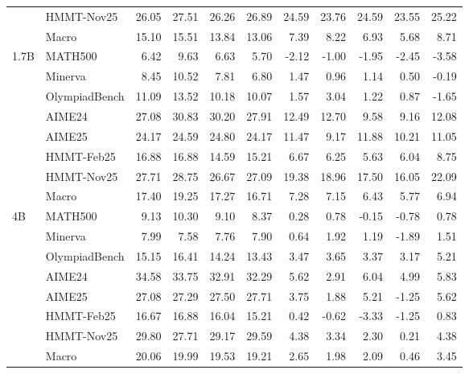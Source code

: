 \documentclass[10pt]{article}
\begin{document}
\begin{table}[h]
\begin{tabular}{llrrrrrrrr|r}
 & HMMT-Nov25 & 26.05 & 27.51 & 26.26 & 26.89 & 24.59 & 23.76 & 24.59 & 23.55 & 25.22 \\
\cmidrule(lr){2-11}
 & Macro & 15.10 & 15.51 & 13.84 & 13.06 & 7.39 & 8.22 & 6.93 & 5.68 & 8.71 \\
\midrule
1.7B & MATH500 & 6.42 & 9.63 & 6.63 & 5.70 & -2.12 & -1.00 & -1.95 & -2.45 & -3.58 \\
 & Minerva & 8.45 & 10.52 & 7.81 & 6.80 & 1.47 & 0.96 & 1.14 & 0.50 & -0.19 \\
 & OlympiadBench & 11.09 & 13.52 & 10.18 & 10.07 & 1.57 & 3.04 & 1.22 & 0.87 & -1.65 \\
 & AIME24 & 27.08 & 30.83 & 30.20 & 27.91 & 12.49 & 12.70 & 9.58 & 9.16 & 12.08 \\
 & AIME25 & 24.17 & 24.59 & 24.80 & 24.17 & 11.47 & 9.17 & 11.88 & 10.21 & 11.05 \\
 & HMMT-Feb25 & 16.88 & 16.88 & 14.59 & 15.21 & 6.67 & 6.25 & 5.63 & 6.04 & 8.75 \\
 & HMMT-Nov25 & 27.71 & 28.75 & 26.67 & 27.09 & 19.38 & 18.96 & 17.50 & 16.05 & 22.09 \\
\cmidrule(lr){2-11}
 & Macro & 17.40 & 19.25 & 17.27 & 16.71 & 7.28 & 7.15 & 6.43 & 5.77 & 6.94 \\
\midrule
4B & MATH500 & 9.13 & 10.30 & 9.10 & 8.37 & 0.28 & 0.78 & -0.15 & -0.78 & 0.78 \\
 & Minerva & 7.99 & 7.58 & 7.76 & 7.90 & 0.64 & 1.92 & 1.19 & -1.89 & 1.51 \\
 & OlympiadBench & 15.15 & 16.41 & 14.24 & 13.43 & 3.47 & 3.65 & 3.37 & 3.17 & 5.21 \\
 & AIME24 & 34.58 & 33.75 & 32.91 & 32.29 & 5.62 & 2.91 & 6.04 & 4.99 & 5.83 \\
 & AIME25 & 27.08 & 27.29 & 27.50 & 27.71 & 3.75 & 1.88 & 5.21 & -1.25 & 5.62 \\
 & HMMT-Feb25 & 16.67 & 16.88 & 16.04 & 15.21 & 0.42 & -0.62 & -3.33 & -1.25 & 0.83 \\
 & HMMT-Nov25 & 29.80 & 27.71 & 29.17 & 29.59 & 4.38 & 3.34 & 2.30 & 0.21 & 4.38 \\
\cmidrule(lr){2-11}
 & Macro & 20.06 & 19.99 & 19.53 & 19.21 & 2.65 & 1.98 & 2.09 & 0.46 & 3.45 \\
\bottomrule
\end{tabular}
\end{table}
\end{document}
